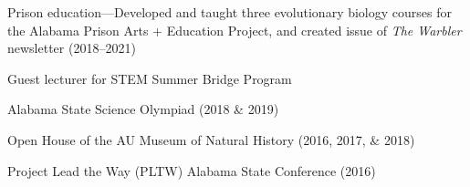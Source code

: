 \begin{veryTightItemize}
    \item Prison education---Developed and taught three evolutionary biology
        courses for the Alabama Prison Arts + Education Project, and created
        issue of \emph{The Warbler} newsletter (2018--2021)
    \item Guest lecturer for STEM Summer Bridge Program
    \item Alabama State Science Olympiad (2018 \& 2019)
    \item Open House of the AU Museum of Natural History (2016, 2017, \& 2018)
    \item Project Lead the Way (PLTW) Alabama State Conference (2016)
\end{veryTightItemize}
